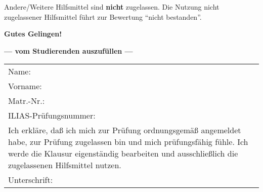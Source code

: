 \begin{coverpages}
\begin{minipage}[c]{0.5\textwidth}
\begin{minipage}[c]{0.96\textwidth}
\begin{itemize}
                \smallskip
                Andere/Weitere Hilfsmittel sind \textbf{nicht} zugelassen. Die
                Nutzung nicht zugelassener Hilfsmittel führt zur Bewertung
                \enquote{nicht bestanden}.
            \end{itemize}
            \bigskip
            \medskip
            \textbf{Gutes Gelingen!}
            \smallskip
            \vspace{2mm}
        \end{minipage}
    \end{minipage}
    \vrule
    \begin{minipage}[c]{0.5\textwidth}
        \bigskip
        \begin{center}
            \textcolor{headcolor}
            {\textbf{--- vom Studierenden auszufüllen ---}} \\[6mm]
        \end{center}
        \begin{center}
            \renewcommand{\arraystretch}{1.5}
            \begin{tabular}{@{\bfseries}lp{5cm}}
                Name:     & \dotfill \\[1mm]
                Vorname:  & \dotfill \\[1mm]
                Matr.-Nr.:& \dotfill \\[6mm]
                ILIAS-Prüfungsnummer:& \dotfill \\[6mm]

                \multicolumn{2}{l}{\begin{minipage}[c]{76mm}
                                       Ich erkläre, daß ich mich zur Prüfung ordnungsgemäß angemeldet habe,
                                       zur Prüfung zugelassen bin und mich prüfungsfähig fühle.
                                       Ich werde die Klausur eigenständig bearbeiten und aus\-schließlich die
                                       zugelassenen Hilfsmittel nutzen.
                \end{minipage}
                }\\[22mm]

                Unterschrift:& \dotfill
            \end{tabular}
        \end{center}
        \smallskip
    \end{minipage}
    \par\hrulefill\par
    \vspace{10mm}


\end{coverpages}
